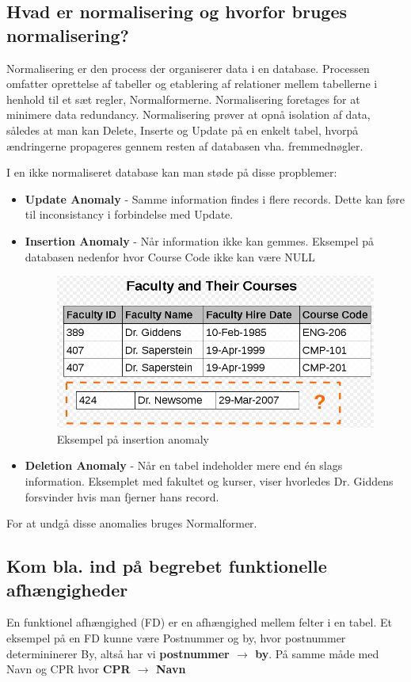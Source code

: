 \newpage

\subsection{Hvad er normalisering og hvorfor bruges normalisering?}\label{sec:normal}
Normalisering er den process der organiserer data i en database. Processen omfatter oprettelse af tabeller og etablering af relationer mellem tabellerne i henhold til et sæt regler, Normalformerne. Normalisering foretages for at minimere data redundancy. Normalisering prøver at opnå isolation af data, således at man kan Delete, Inserte og Update på en enkelt tabel, hvorpå ændringerne propageres gennem resten af databasen vha. fremmednøgler.

I en ikke normaliseret database kan man støde på disse propblemer:

\begin{itemize}
	\item \textbf{Update Anomaly} - Samme information findes i flere records. Dette kan føre til inconsistancy i forbindelse med Update.
	\item \textbf{Insertion Anomaly} - Når information ikke kan gemmes. Eksempel på databasen nedenfor hvor Course Code ikke kan være NULL
		\begin{figure}
			\centering
			\includegraphics[width=0.7\linewidth]{figs/spm5/insertionAnomaly.PNG}
			\caption{Eksempel på insertion anomaly}
			\label{fig:insertionAnomaly}
		\end{figure}
	\item \textbf{Deletion Anomaly} - Når en tabel indeholder mere end én slags information. Eksemplet med fakultet og kurser, viser hvorledes Dr. Giddens forsvinder hvis man fjerner hans record.	
\end{itemize}

For at undgå disse anomalies bruges Normalformer.

\subsection{Kom bla. ind på begrebet funktionelle afhængigheder}
En funktionel afhængighed (FD) er en afhængighed mellem felter i en tabel.
Et eksempel på en FD kunne være Postnummer og by, hvor postnummer determininerer By, altså har vi \textbf{postnummer $\rightarrow$ by}. På samme måde med Navn og CPR hvor \textbf{CPR $\rightarrow$ Navn}

